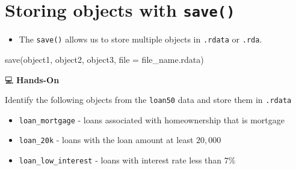 \documentclass[
  letterpaper,
  DIV=11,
  numbers=noendperiod]{scrreprt}
\newenvironment{Shaded}{\begin{snugshade}}{\end{snugshade}}
\newcommand{\AttributeTok}[1]{\textcolor[rgb]{0.40,0.45,0.13}{#1}}
\newcommand{\FunctionTok}[1]{\textcolor[rgb]{0.28,0.35,0.67}{#1}}
\newcommand{\NormalTok}[1]{\textcolor[rgb]{0.00,0.23,0.31}{#1}}
\newcommand{\StringTok}[1]{\textcolor[rgb]{0.13,0.47,0.30}{#1}}
\providecommand{\tightlist}{%
  \setlength{\itemsep}{0pt}\setlength{\parskip}{0pt}}\usepackage{longtable,booktabs,array}
\begin{document}
\section{\texorpdfstring{Storing objects with
\texttt{save()}}{Storing objects with save()}}\label{storing-objects-with-save}

\begin{itemize}
\tightlist
\item
  The \texttt{save()} allows us to store multiple objects in
  \texttt{.rdata} or \texttt{.rda}.
\end{itemize}

\begin{Shaded}
\begin{Highlighting}[]
\FunctionTok{save}\NormalTok{(object1, object2, object3, }\AttributeTok{file =} \StringTok{\textquotesingle{}file\_name.rdata\textquotesingle{}}\NormalTok{)}
\end{Highlighting}
\end{Shaded}

💻 \textbf{Hands-On}

Identify the following objects from the \texttt{loan50} data and store
them in \texttt{.rdata}

\begin{itemize}
\item
  \texttt{loan\_mortgage} - loans associated with homeownership that is
  mortgage
\item
  \texttt{loan\_20k} - loans with the loan amount at least \(20,000\)
\item
  \texttt{loan\_low\_interest} - loans with interest rate less than
  \(7\%\)
\end{itemize}
\end{document}
